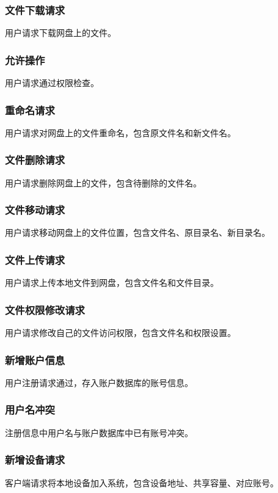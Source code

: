 \subsubsection{文件下载请求}
用户请求下载网盘上的文件。

\subsubsection{允许操作}
用户请求通过权限检查。

\subsubsection{重命名请求}
用户请求对网盘上的文件重命名，包含原文件名和新文件名。

\subsubsection{文件删除请求}
用户请求删除网盘上的文件，包含待删除的文件名。

\subsubsection{文件移动请求}
用户请求移动网盘上的文件位置，包含文件名、原目录名、新目录名。

\subsubsection{文件上传请求}
用户请求上传本地文件到网盘，包含文件名和文件目录。

\subsubsection{文件权限修改请求}
用户请求修改自己的文件访问权限，包含文件名和权限设置。

\subsubsection{新增账户信息}
用户注册请求通过，存入账户数据库的账号信息。

\subsubsection{用户名冲突}
注册信息中用户名与账户数据库中已有账号冲突。

\subsubsection{新增设备请求}
客户端请求将本地设备加入系统，包含设备地址、共享容量、对应账号。

